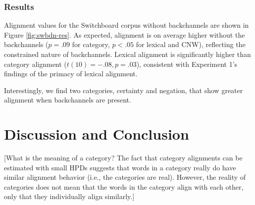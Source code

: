 \documentclass[11pt]{article}
\begin{document}
\subsubsection{Results}
Alignment values for the Switchboard corpus without backchannels are shown in Figure \ref{fig:swbdn-res}. As expected, alignment is on average higher without the backchannels ($p=.09$ for category, $p<.05$ for lexical and CNW), reflecting the constrained nature of backchannels. Lexical alignment is significantly higher than category alignment ($t(10)=-.08, p=.03$), consistent with Experiment 1's findings of the primacy of lexical alignment.

Interestingly, we find two categories, certainty and negation, that show greater alignment when backchannels are present.

\section{Discussion and Conclusion}
[What is the meaning of a category? The fact that category alignments can be estimated with small HPDs suggests that words in a category really do have similar alignment behavior (i.e., the categories are real). However, the reality of categories does not mean that the words in the category align with each other, only that they individually align similarly.]


%

%
%
\newpage



\appendix


\end{document}
